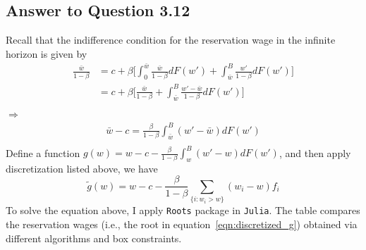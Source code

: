 \documentclass[11pt]{article}
\theoremstyle{definition}
\theoremstyle{boldtitle} %
\numberwithin{equation}{section}
\numberwithin{figure}{section}
\numberwithin{table}{section}
\begin{document}
\subsection*{Answer to Question 3.12}
Recall that the indifference condition for the reservation wage in the infinite horizon is given by
\begin{align*}
  \frac{\bar{w}}{1 - \beta} & = c + \beta \bigg[\int_{0}^{\bar{w}} \frac{\bar{w}}{1 - \beta} dF(w') + \int_{\bar{w}}^B \frac{w'}{1 - \beta} dF(w') \bigg] \\
  & = c + \beta \bigg[\frac{\bar{w}}{1 - \beta} + \int_{\bar{w}}^B \frac{w' - \bar{w}}{1 - \beta} dF(w') \bigg] \\
\end{align*}
$\Rightarrow$
\begin{align*}
  \bar{w} - c = \frac{\beta}{1 - \beta}  \int_{\bar{w}}^B (w' - \bar{w}) dF(w') \\
\end{align*}
Define a function $g(w) = w - c - \frac{\beta}{1 - \beta}  \int_{w}^B (w' - w) dF(w')$, and then 
apply discretization listed above, we have
\begin{equation}
  \label{eqn:discretized_g}
  \tilde{g}(w) = w - c - \frac{\beta}{1 - \beta} \sum_{\{i: w_i > w \}} (w_i - w) f_i
\end{equation}
To solve the equation above, I apply \texttt{Roots} package in \texttt{Julia}.
The table compares the reservation wages (i.e., the root in equation~\ref{eqn:discretized_g}) obtained via different algorithms and box constraints.
\end{document}
